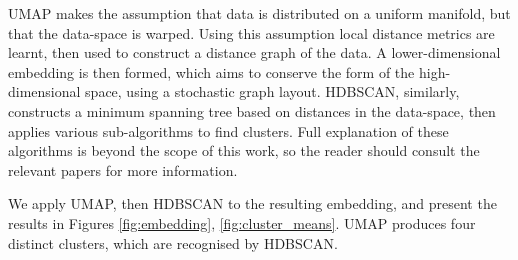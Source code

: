 \documentclass[manuscript,screen,review]{acmart}
\begin{document}
UMAP makes the assumption that data is distributed on a uniform manifold, but that the data-space is warped. Using this assumption local distance metrics are learnt, then used to construct a distance graph of the data. A lower-dimensional embedding is then formed, which aims to conserve the form of the high-dimensional space, using a stochastic graph layout. HDBSCAN, similarly, constructs a minimum spanning tree based on distances in the data-space, then applies various sub-algorithms to find clusters. Full explanation of these algorithms is beyond the scope of this work, so the reader should consult the relevant papers for more information.

We apply UMAP, then HDBSCAN to the resulting embedding, and present the results in Figures \ref{fig:embedding}, \ref{fig:cluster_means}. UMAP produces four distinct clusters, which are recognised by HDBSCAN. 
\end{document}
